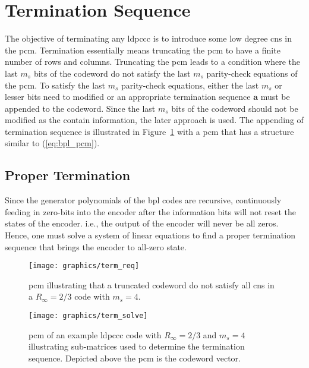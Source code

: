 \section{Termination Sequence}\label{sec:bpl_termi}
The objective of terminating any \gls{ldpccc} is to introduce some low degree \glspl{cn} in the \gls{pcm}. Termination essentially means truncating the \gls{pcm} to have a finite number of rows and columns. Truncating the \gls{pcm} leads to a condition where the last $m_s$ bits of the codeword do not satisfy the last $m_s$ parity-check equations of the \gls{pcm}. To satisfy the last $m_s$ parity-check equations, either the last $m_s$ or lesser bits need to modified or an appropriate termination sequence $\mathbf{a}$ must be appended to the codeword. Since the last $m_s$ bits of the codeword should not be modified as the contain information, the later approach is used. The appending of termination sequence is illustrated in Figure~\ref{fig:term_req} with a \gls{pcm} that has a structure similar to (\ref{eq:bpl_pcm}).

\subsection{Proper Termination}
Since the generator polynomials of the \gls{bpl} codes are recursive, continuously feeding in zero-bits into the encoder after the information bits will not reset the states of the encoder. i.e., the output of the encoder will never be all zeros. Hence, one must solve a system of linear equations to find a proper termination sequence that brings the encoder to all-zero state.

\begin{figure}[htbp]
  \centering
  \texttt{[image: graphics/term\_req]}
  \caption[Illustration of truncated codeword and its \acrshort{pcm}.]{\gls{pcm} illustrating that a truncated codeword do not satisfy all \glspl{cn} in a $R_\infty=2/3$ code with $m_s=4$.}
  \label{fig:term_req}
\end{figure}

\begin{figure}[htbp]
  \centering
  \texttt{[image: graphics/term\_solve]}
  \caption[Illustration of proper termination procedure.]{\gls{pcm} of an example \gls{ldpccc} code with $R_\infty=2/3$ and $m_s=4$ illustrating sub-matrices used to determine the termination sequence. Depicted above the \gls{pcm} is the codeword vector.}
  \label{fig:bpl_term}
\end{figure}

